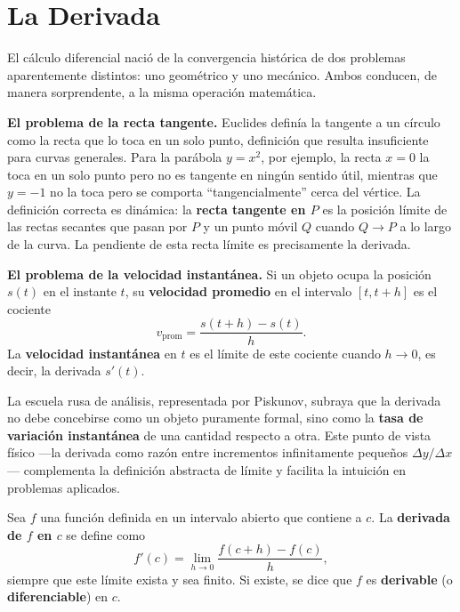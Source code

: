 \chapter{La Derivada}


El cálculo diferencial nació de la convergencia histórica de dos problemas
aparentemente distintos: uno geométrico y uno mecánico. Ambos conducen,
de manera sorprendente, a la misma operación matemática.

\textbf{El problema de la recta tangente.} Euclides definía la tangente
a un círculo como la recta que lo toca en un solo punto, definición que
resulta insuficiente para curvas generales. Para la parábola $y=x^2$, por
ejemplo, la recta $x=0$ la toca en un solo punto pero no es tangente en
ningún sentido útil, mientras que $y=-1$ no la toca pero se comporta
``tangencialmente'' cerca del vértice. La definición correcta es dinámica:
la \textbf{recta tangente en $P$} es la posición límite de las rectas
secantes que pasan por $P$ y un punto móvil $Q$ cuando $Q\to P$ a lo largo
de la curva. La pendiente de esta recta límite es precisamente la derivada.

\textbf{El problema de la velocidad instantánea.} Si un objeto ocupa la
posición $s(t)$ en el instante $t$, su \textbf{velocidad promedio} en el
intervalo $[t, t+h]$ es el cociente
\[
v_{\text{prom}} = \frac{s(t+h)-s(t)}{h}.
\]
La \textbf{velocidad instantánea} en $t$ es el límite de este cociente
cuando $h\to 0$, es decir, la derivada $s'(t)$.

\begin{rem}
La escuela rusa de análisis, representada por Piskunov, subraya que la
derivada no debe concebirse como un objeto puramente formal, sino como la
\textbf{tasa de variación instantánea} de una cantidad respecto a otra.
Este punto de vista físico ---la derivada como razón entre incrementos
infinitamente pequeños $\Delta y / \Delta x$--- complementa la definición
abstracta de límite y facilita la intuición en problemas aplicados.
\end{rem}


\begin{definition}
Sea $f$ una función definida en un intervalo abierto que contiene a $c$.
La \textbf{derivada de $f$ en $c$} se define como
\[
f'(c) = \lim_{h \to 0} \frac{f(c+h)-f(c)}{h},
\]
siempre que este límite exista y sea finito. Si existe, se dice que $f$ es
\textbf{derivable} (o \textbf{diferenciable}) en $c$.
\end{definition}

